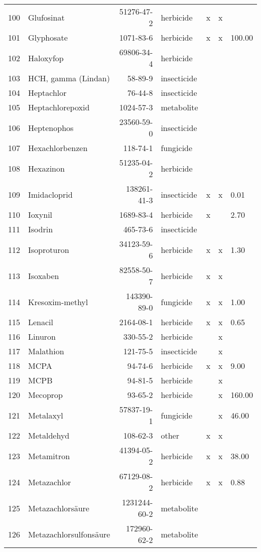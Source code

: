 \begin{longtable}{lp{3cm}rlp{0.5cm}p{0.5cm}p{1cm}}
  100 & Glufosinat & 51276-47-2 & herbicide & x & x &  \\ 
  101 & Glyphosate & 1071-83-6 & herbicide & x & x & 100.00 \\ 
  102 & Haloxyfop & 69806-34-4 & herbicide &  &  &  \\ 
  103 & HCH, gamma (Lindan) & 58-89-9 & insecticide &  &  &  \\ 
  104 & Heptachlor & 76-44-8 & insecticide &  &  &  \\ 
  105 & Heptachlorepoxid & 1024-57-3 & metabolite &  &  &  \\ 
  106 & Heptenophos & 23560-59-0 & insecticide &  &  &  \\ 
  107 & Hexachlorbenzen & 118-74-1 & fungicide &  &  &  \\ 
  108 & Hexazinon & 51235-04-2 & herbicide &  &  &  \\ 
  109 & Imidacloprid & 138261-41-3 & insecticide & x & x & 0.01 \\ 
  110 & Ioxynil & 1689-83-4 & herbicide & x &  & 2.70 \\ 
  111 & Isodrin & 465-73-6 & insecticide &  &  &  \\ 
  112 & Isoproturon & 34123-59-6 & herbicide & x & x & 1.30 \\ 
  113 & Isoxaben & 82558-50-7 & herbicide & x & x &  \\ 
  114 & Kresoxim-methyl & 143390-89-0 & fungicide & x & x & 1.00 \\ 
  115 & Lenacil & 2164-08-1 & herbicide & x & x & 0.65 \\ 
  116 & Linuron & 330-55-2 & herbicide &  & x &  \\ 
  117 & Malathion & 121-75-5 & insecticide &  & x &  \\ 
  118 & MCPA & 94-74-6 & herbicide & x & x & 9.00 \\ 
  119 & MCPB & 94-81-5 & herbicide &  & x &  \\ 
  120 & Mecoprop & 93-65-2 & herbicide &  & x & 160.00 \\ 
  121 & Metalaxyl & 57837-19-1 & fungicide &  & x & 46.00 \\ 
  122 & Metaldehyd & 108-62-3 & other & x & x &  \\ 
  123 & Metamitron & 41394-05-2 & herbicide & x & x & 38.00 \\ 
  124 & Metazachlor & 67129-08-2 & herbicide & x & x & 0.88 \\ 
  125 & Metazachlorsäure & 1231244-60-2 & metabolite &  &  &  \\ 
  126 & Metazachlorsulfonsäure & 172960-62-2 & metabolite &  &  &  \\ 

\end{longtable}
